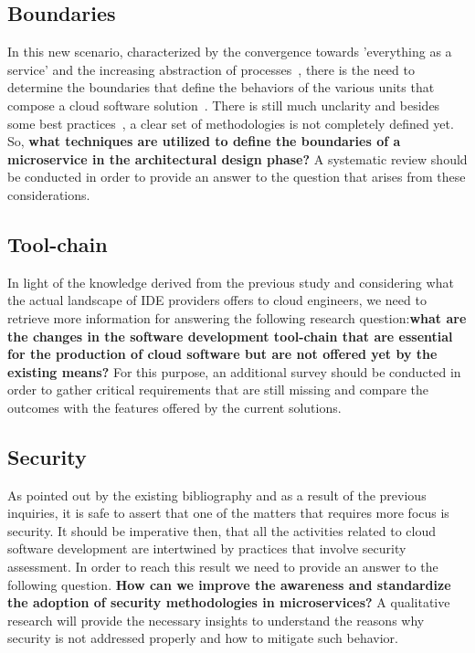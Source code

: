 \documentclass[a4paper, 10pt, conference]{ieeeconf}
\begin{document}
\subsection{Boundaries}

In this new scenario, characterized by the convergence towards 'everything as a service' and the increasing abstraction of processes~\cite{automatic-dev}, there is the need to determine the boundaries that define the behaviors of the various units that compose a cloud software solution~\cite{overview-platforms}. There is still much unclarity and besides some best practices~\cite{research-mss}, a clear set of methodologies is not completely defined yet. So, \textbf{what techniques are utilized to define the boundaries of a microservice in the architectural design phase?} A systematic review should be conducted in order to provide an answer to the question that arises from these considerations.

\subsection{Tool-chain}

In light of the knowledge derived from the previous study and considering what the actual landscape of IDE providers offers to cloud engineers, we need to retrieve more information for answering the following research question:\textbf{what are the changes in the software development tool-chain that are essential for the production of cloud software but are not offered yet by the existing means?}
For this purpose, an additional survey should be conducted in order to gather critical requirements that are still missing and compare the outcomes with the features offered by the current solutions.

\subsection{Security}

As pointed out by the existing bibliography and as a result of the previous inquiries, it is safe to assert that one of the matters that requires more focus is security. It should be imperative then, that all the activities related to cloud software development are intertwined by practices that involve security assessment. In order to reach this result we need to provide an answer to the following question.
\textbf{How can we improve the awareness and standardize the adoption of security methodologies in microservices?}
A qualitative research will provide the necessary insights to understand the reasons why security is not addressed properly and how to mitigate such behavior.
\end{document}
